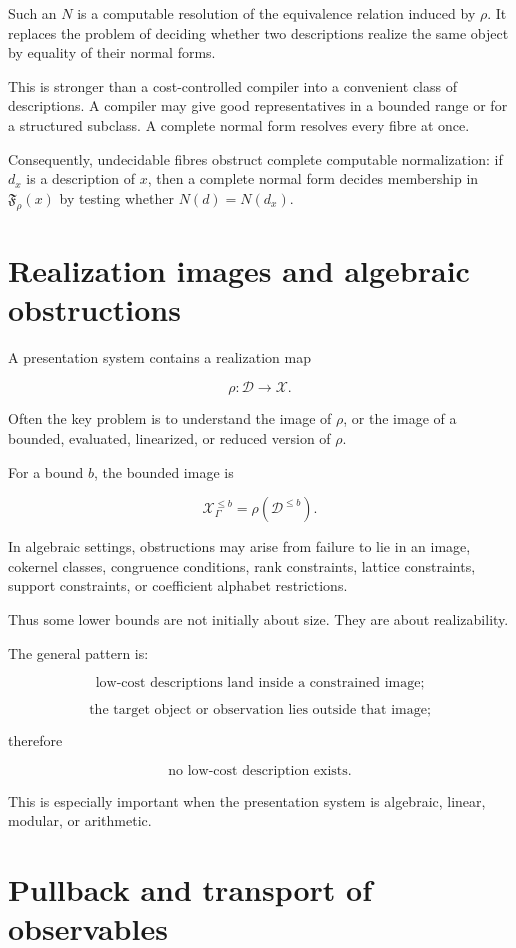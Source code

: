 \documentclass[11pt]{article}
\begin{document}
Such an \(N\) is a computable resolution of the equivalence relation induced by \(\rho\). It replaces the problem of deciding whether two descriptions realize the same object by equality of their normal forms.

This is stronger than a cost-controlled compiler into a convenient class of descriptions. A compiler may give good representatives in a bounded range or for a structured subclass. A complete normal form resolves every fibre at once.

Consequently, undecidable fibres obstruct complete computable normalization: if \(d_x\) is a description of \(x\), then a complete normal form decides membership in \(\mathfrak F_\rho(x)\) by testing whether \(N(d)=N(d_x)\).


\section{Realization images and algebraic obstructions}

A presentation system contains a realization map

\[
\rho:\mathcal D\to\mathcal X.
\]

Often the key problem is to understand the image of \(\rho\), or the image of a bounded, evaluated, linearized, or reduced version of \(\rho\).

For a bound \(b\), the bounded image is

\[
\mathcal X_\Gamma^{\leq b}=\rho(\mathcal D^{\leq b}).
\]

In algebraic settings, obstructions may arise from failure to lie in an image, cokernel classes, congruence conditions, rank constraints, lattice constraints, support constraints, or coefficient alphabet restrictions.

Thus some lower bounds are not initially about size. They are about realizability.

The general pattern is:

\[
\text{low-cost descriptions land inside a constrained image;}
\]

\[
\text{the target object or observation lies outside that image;}
\]

therefore

\[
\text{no low-cost description exists.}
\]

This is especially important when the presentation system is algebraic, linear, modular, or arithmetic.


\section{Pullback and transport of observables}
\end{document}
